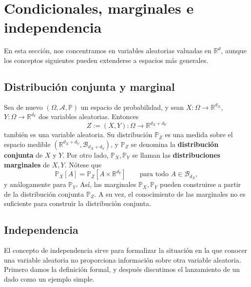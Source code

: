\documentclass[11pt]{report}
\theoremstyle{definition}
\theoremstyle{plain}
\numberwithin{equation}{section}
\begin{document}
\section{Condicionales, marginales e independencia}

En esta sección, nos concentramos en variables aleatorias valuadas en \(\mathbb{R}^d\), aunque los conceptos siguientes pueden extenderse a espacios más generales.

\subsection{Distribución conjunta y marginal}

Sea de nuevo \((\Omega,\mathcal{A},\mathbb{P})\) un espacio de probabilidad, y sean \(X:\Omega\to\mathbb{R}^{d_X}\), \(Y:\Omega\to\mathbb{R}^{d_Y}\) dos variables aleatorias. Entonces
\begin{equation*}
    Z:=(X,Y):\Omega\to\mathbb{R}^{d_X+d_Y}
\end{equation*}
también es una variable aleatoria. Su distribución \(\mathbb{P}_Z\) es una medida sobre el espacio medible \((\mathbb{R}^{d_X+d_Y},\mathcal{B}_{d_X+d_Y})\), y \(\mathbb{P}_Z\) se denomina la \textbf{distribución conjunta} de \(X\) y \(Y\). Por otro lado, \(\mathbb{P}_X,\mathbb{P}_Y\) se llaman las \textbf{distribuciones marginales} de \(X,Y\). Nótese que
\begin{equation*}
    \mathbb{P}_X[A]
    =
    \mathbb{P}_Z[A\times\mathbb{R}^{d_Y}]
    \qquad
    \text{para todo } A\in\mathcal{B}_{d_X},
\end{equation*}
y análogamente para \(\mathbb{P}_Y\). Así, las marginales \(\mathbb{P}_X,\mathbb{P}_Y\) pueden construirse a partir de la distribución conjunta \(\mathbb{P}_Z\). A su vez, el conocimiento de las marginales no es suficiente para construir la distribución conjunta.

\subsection{Independencia}

El concepto de independencia sirve para formalizar la situación en la que conocer una variable aleatoria no proporciona información sobre otra variable aleatoria. Primero damos la definición formal, y después discutimos el lanzamiento de un dado como un ejemplo simple.
\end{document}

